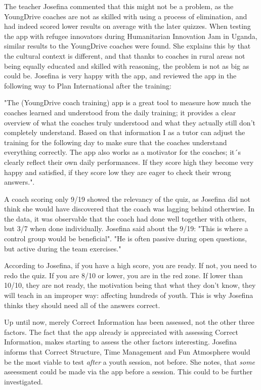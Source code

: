 The teacher Josefina commented that this might not be a problem, as the YoungDrive coaches are not as skilled with using a process of elimination, and had indeed scored lower results on average with the later quizzes. When testing the app with refugee innovators during Humanitarian Innovation Jam in Uganda, similar results to the YoungDrive coaches were found. She explains this by that the cultural context is different, and that thanks to coaches in rural areas not being equally educated and skilled with reasoning, the problem is not as big as could be. Josefina is very happy with the app, and reviewed the app in the following way to Plan International after the training:

"The (YoungDrive coach training) app is a great tool to measure how much the coaches learned and understood from the daily training; it provides a clear overview of what the coaches truly understood and what they actually still don’t completely understand. Based on that information I as a tutor can adjust the training for the following day to make sure that the coaches understand everything correctly. The app also works as a motivator for the coaches; it´s clearly reflect their own daily performances. If they score high they become very happy and satisfied, if they score low they are eager to check their wrong answers.".

A coach scoring only 9/19 showed the relevancy of the quiz, as Josefina did not think she would have discovered that the coach was lagging behind otherwise. In the data, it was observable that the coach had done well together with others, but 3/7 when done individually. Josefina said about the 9/19: "This is where a control group would be beneficial". "He is often passive during open questions, but active during the team exercises."

According to Josefina, if you have a high score, you are ready. If not, you need to redo the quiz. If you are 8/10 or lower, you are in the red zone. If lower than 10/10, they are not ready, the motivation being that what they don't know, they will teach in an improper way: affecting hundreds of youth. This is why Josefina thinks they should need all of the answers correct.

Up until now, merely Correct Information has been assessed, not the other three factors. The fact that the app already is appreciated with assessing Correct Information, makes starting to assess the other factors interesting. Josefina informs that Correct Structure, Time Management and Fun Atmosphere would be the most viable to test \textit{after} a youth session, not before. She notes, that \textit{some} aseessment could be made via the app before a session. This could to be further investigated.
